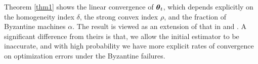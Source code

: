 \documentclass[12pt,a4paper]{article}%
\newtheorem{lem}{Lemma}[section]
\newcommand \vc[1]{{\mbox{\boldmath${#1}$}}}
\newcommand \vtheta{\vc \theta}
\numberwithin{equation}{section}
\begin{document}

Theorem \ref{thm1} shows the linear convergence of $\vtheta_t$, which depends explicitly on the homogeneity index $\delta$,  the strong convex index $\rho$, and the fraction of Byzantine machines $\alpha$. The result is viewed as an extension of that in \cite{JordanLeeYang2019} and \cite{FanGuoWang2019}. A significant difference from theirs is that, we allow the initial estimator to be inaccurate, and with high probability we have more explicit rates of convergence on optimization errors under the Byzantine failures.
\end{document}
